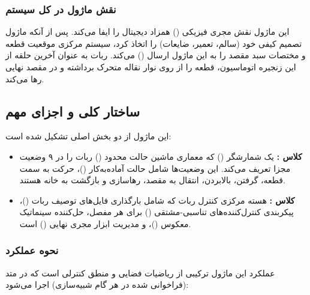 \documentclass{article}
\begin{document}
\subsubsection{نقش ماژول در کل سیستم}
این ماژول نقش مجری فیزیکی () همزاد دیجیتال را ایفا می‌کند. پس از آنکه ماژول  تصمیم کیفی خود (سالم، تعمیر، ضایعات) را اتخاذ کرد، سیستم مرکزی موقعیت قطعه و مختصات سبد مقصد را به این ماژول ارسال () می‌کند. ربات به عنوان آخرین حلقه از این زنجیره اتوماسیون، قطعه را از روی نوار نقاله متحرک برداشته و در مقصد نهایی رها می‌کند.

\subsection{ساختار کلی و اجزای مهم}
این ماژول از دو بخش اصلی تشکیل شده است:

\begin{itemize}
	\item \textbf{کلاس :} یک شمارشگر () که معماری ماشین حالت محدود () ربات را در ۹ وضعیت مجزا تعریف می‌کند. این وضعیت‌ها شامل حالت آماده‌به‌کار ()، حرکت به سمت قطعه، گرفتن، بالابردن، انتقال به مقصد، رهاسازی و بازگشت به خانه هستند.
	\item \textbf{کلاس :} هسته مرکزی کنترل ربات که شامل بارگذاری فایل‌های توصیف ربات ()، پیکربندی کنترل‌کننده‌های تناسبی-مشتقی () برای هر مفصل، حل‌کننده سینماتیک معکوس ()، و مدیریت ابزار مجری نهایی () است.
\end{itemize}

\subsubsection{نحوه عملکرد}
عملکرد این ماژول ترکیبی از ریاضیات فضایی و منطق کنترلی است که در متد  (فراخوانی شده در هر گام شبیه‌سازی) اجرا می‌شود:
\end{document}
